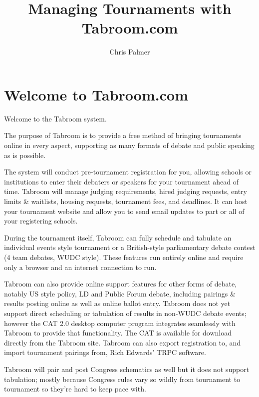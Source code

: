 \documentclass[12pt]{report}
\author{Chris Palmer}
\begin{document}
 
\normalsize

\title{Managing Tournaments with Tabroom.com} \maketitle

\date

\tableofcontents

\setlength{\parskip}{\baselineskip}%
\setlength{\parindent}{10pt}%
\newpage
\onehalfspacing

\chapter{Welcome to Tabroom.com}

Welcome to the Tabroom system.  

The purpose of Tabroom is to provide a free method of bringing tournaments
online in every aspect, supporting as many formats of debate and public
speaking as is possible.

The system will conduct pre-tournament registration for you, allowing schools
or institutions to enter their debaters or speakers for your tournament ahead
of time.  Tabroom will manage judging requirements, hired judging requests,
entry limits \& waitlists, housing requests, tournament fees, and deadlines.
It can host your tournament website and allow you to send email updates to part
or all of your registering schools.

During the tournament itself, Tabroom can fully schedule and tabulate an
individual events style tournament or a British-style parliamentary debate
contest (4 team debates, WUDC style).  These features run entirely online and
require only a browser and an internet connection to run.

Tabroom can also provide online support features for other forms of debate,
notably US style policy, LD and Public Forum debate, including pairings \&
results posting online as well as online ballot entry.  Tabroom does not yet
support direct scheduling or tabulation of results in non-WUDC debate events;
however the CAT 2.0 desktop computer program integrates seamlessly with Tabroom
to provide that functionality.  The CAT is available for download directly from
the Tabroom site.  Tabroom can also export registration to, and import
tournament pairings from, Rich Edwards' TRPC software.

Tabroom will pair and post Congress schematics as well but it does not support
tabulation; mostly because Congress rules vary so wildly from tournament to
tournament so they're hard to keep pace with.
\end{document}
